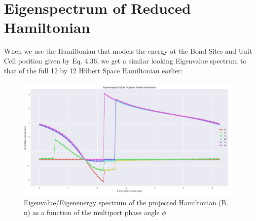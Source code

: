 \section{Eigenspectrum of Reduced Hamiltonian}
When we use the Hamiltonian that models the energy at the Bond Sites and Unit Cell position given by Eq. 4.36, we get a similar looking Eigenvalue spectrum to that of the full 12 by 12 Hilbert Space Hamiltonian earlier:
\begin{figure}[H]
    \centering
    \includegraphics[scale=0.4]{2_Body/reduced_eig_spec.png}
    \caption{Eigenvalue/Eigenenergy spectrum of the projected Hamiltonian (B, n) as a function of the multiport phase angle $\phi$}
    \label{fig:my_label}
\end{figure}
